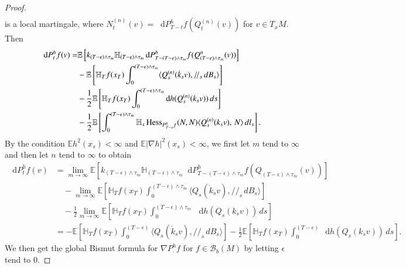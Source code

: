 \documentclass[11pt,twoside, reqno]{article}
\newcommand{\ed}{\mathop{}\!\mathrm{d}}
\def\r{\right}
\def\l{\left}
\def\mathpal#1{\mathop{\mathchoice{\text{\rm #1}}%
   {\text{\rm #1}}{\text{\rm #1}}%
   {\text{\rm #1}}}\nolimits}
\newcommand\Hess{\mathpal{Hess}}
\newcommand\1{\mathbbm{1}}
\newcommand\E{\mathbb{E}}
\theoremstyle{definition}
\numberwithin{equation}{section}
\begin{document}
\begin{proof}
\begin{align*}
\end{align*}
is a local martingale, where $N_t^{(n)}(v)=\ed P_{T-t}^h f(Q_t^{(n)}(v))$ for $v\in T_xM$.  Then
\begin{align*}
\ed P_t^{h}f(v)=&\E\l[k_{{(T-\epsilon)}\wedge \tau_m}\mathbb{H}_{(T-\epsilon)\wedge \tau_m} \ed P_{T-(T-\epsilon)\wedge \tau_m}^{h}f(Q^{n}_{(T-\epsilon)\wedge \tau_m}(v))  \r]\\
&-\E \l[\mathbb{H}_{T} f(x_T) \int_0^{{(T-\epsilon)}\wedge \tau_m} \langle Q_s^{(n)}(\dot{k}_s v), /\!/_s \,dB_s \rangle\r]\\
&-\frac{1}{2}\E\l[\mathbb{H}_T f(x_T) \int_0^{{(T-\epsilon)}\wedge \tau_m } \ed h(Q_s^{(n)}(k_s v))\, ds \r]\\
&-\frac{1}{2} \E \l[\int_0^{{(T-\epsilon)}\wedge \tau_m } \mathbb{H}_s \Hess_{P_{T-s}^h f}(N,N)\langle Q_s^{(n)}(k_sv),\, N \rangle \, dl_s\r].
\end{align*}
By the condition $\E h^2(x_s)< \infty$ and $\E |\nabla h|^2(x_s)< \infty$,  we  first let $m$ tend to $\infty$ and then let $n$ tend to $\infty$ to  obtain
\begin{align*}
\ed P_t^{h}f(v)&=\lim_{m\rightarrow \infty}\E\l[k_{{(T-\epsilon)}\wedge \tau_m}\mathbb{H}_{(T-\epsilon)\wedge \tau_m} \ed P_{T-(T-\epsilon)\wedge \tau_m}^{h}f(Q_{(T-\epsilon)\wedge \tau_m}(v))  \r]\\
&\quad-\lim_{m\rightarrow \infty}\E \l[\mathbb{H}_{T} f(x_T) \int_0^{{(T-\epsilon)}\wedge \tau_m} \langle Q_s(\dot{k}_s v), /\!/_s \,dB_s \rangle\r]\\
&\quad-\frac{1}{2}\lim_{m\rightarrow \infty}\E\l[\mathbb{H}_T f(x_T) \int_0^{{(T-\epsilon)}\wedge \tau_m } \, \ed h(Q_s(k_s v))\, ds \r]\\
&=-\E \l[\mathbb{H}_{T} f(x_T) \int_0^{{(T-\epsilon)}} \langle Q_s(\dot{k}_s v), /\!/_s \,dB_s \rangle\r]-\frac{1}{2}\E\l[\mathbb{H}_T f(x_T) \int_0^{{(T-\epsilon)} } \ed h(Q_s(k_s v))\, ds \r].
\end{align*}
We then get the 
global Bismut formula for $\nabla P_{\cdot}^hf $ for $ f\in \mathcal{B}_b(M)$ by letting $\epsilon$ tend to $0$. 

\end{proof}
\end{document}

